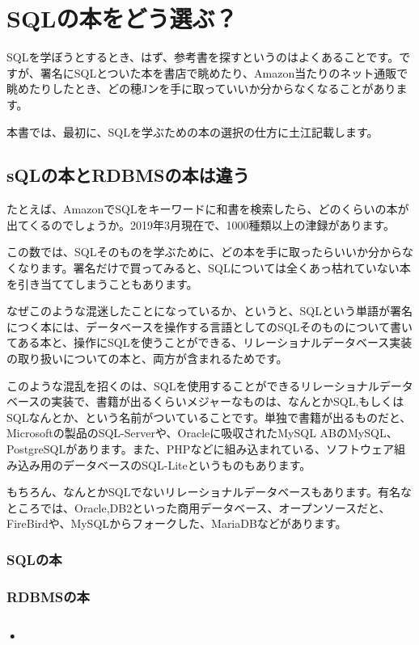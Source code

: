 \chapter{SQLの本をどう選ぶ？}

SQLを学ぼうとするとき、はず、参考書を探すというのはよくあることです。ですが、署名にSQLとついた本を書店で眺めたり、Amazon当たりのネット通販で眺めたりしたとき、どの穂Jンを手に取っていいか分からなくなることがあります。

本書では、最初に、SQLを学ぶための本の選択の仕方に土江記載します。

\section{sQLの本とRDBMSの本は違う}

たとえば、AmazonでSQLをキーワードに和書を検索したら、どのくらいの本が出てくるのでしょうか。2019年3月現在で、1000種類以上の津録があります。

この数では、SQLそのものを学ぶために、どの本を手に取ったらいいか分からなくなります。署名だけで買ってみると、SQLについては全くあっ枯れていない本を引き当ててしまうこともあります。

なぜこのような混迷したことになっているか、というと、SQLという単語が署名につく本には、データベースを操作する言語としてのSQLそのものについて書いてある本と、操作にSQLを使うことができる、リレーショナルデータベース実装の取り扱いについての本と、両方が含まれるためです。

このような混乱を招くのは、SQLを使用することができるリレーショナルデータベースの実装で、書籍が出るくらいメジャーなものは、なんとかSQL,もしくはSQLなんとか、という名前がついていることです。単独で書籍が出るものだと、Microsoftの製品のSQL-Serverや、Oracleに吸収されたMySQL ABのMySQL、PostgreSQLがあります。また、PHPなどに組み込まれている、ソフトウェア組み込み用のデータベースのSQL-Liteというものもあります。

もちろん、なんとかSQLでないリレーショナルデータベースもあります。有名なところでは、Oracle,DB2といった商用データベース、オープンソースだと、FireBirdや、MySQLからフォークした、MariaDBなどがあります。

\subsection{SQLの本}

\subsection{RDBMSの本}

\subsection{•}